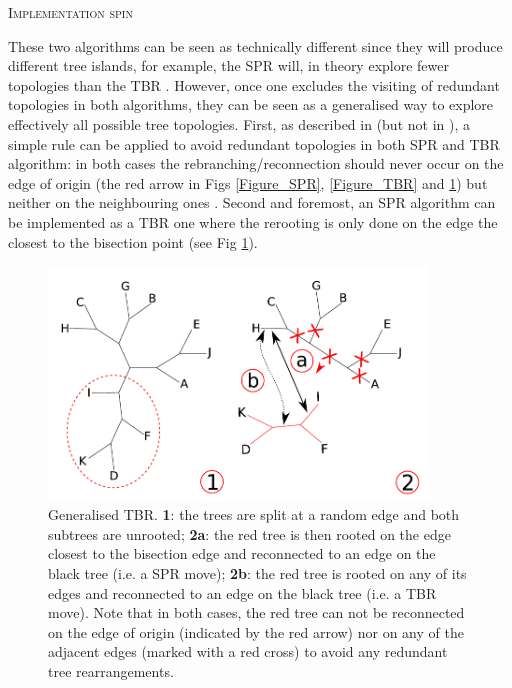 \documentclass[12pt,letterpaper]{article}
\renewcommand{\section}[1]{%
\bigskip
\begin{center}
\begin{Large}
\normalfont\scshape #1
\medskip
\end{Large}
\end{center}}
\begin{document}
\section{Implementation spin}
These two algorithms can be seen as technically different since they will produce different tree islands, for example, the SPR will, in theory explore fewer topologies than the TBR \citep[see above and][]{morrison2007increasing,lakner2008efficiency}.
However, once one excludes the visiting of redundant topologies in both algorithms, they can be seen as a generalised way to explore effectively all possible tree topologies.
First, as described in \cite{allen2001subtree} (but not in \citealt{felsenstein2004inferring}), a simple rule can be applied to avoid redundant topologies in both SPR and TBR algorithm: in both cases the rebranching/reconnection should never occur on the edge of origin (the red arrow in Figs \ref{Figure_SPR}, \ref{Figure_TBR} and \ref{Figure_TBR_modif}) but neither on the neighbouring ones \citep{allen2001subtree}.
Second and foremost, an SPR algorithm can be implemented as a TBR one where the rerooting is only done on the edge the closest to the bisection point (see Fig \ref{Figure_TBR_modif}).

\begin{figure}[!htbp]
\centering
   \includegraphics[width=0.9\textwidth]{Figure/TBR_modif.pdf}
\caption{Generalised TBR. \textbf{1}: the trees are split at a random edge and both subtrees are unrooted; \textbf{2a}: the red tree is then rooted on the edge closest to the bisection edge and reconnected to an edge on the black tree (i.e. a SPR move); \textbf{2b}: the red tree is rooted on any of its edges and reconnected to an edge on the black tree (i.e. a TBR move). Note that in both cases, the red tree can not be reconnected on the edge of origin (indicated by the red arrow) nor on any of the adjacent edges (marked with a red cross) to avoid any redundant tree rearrangements.}
\label{Figure_TBR_modif}
\end{figure}
\end{document}
